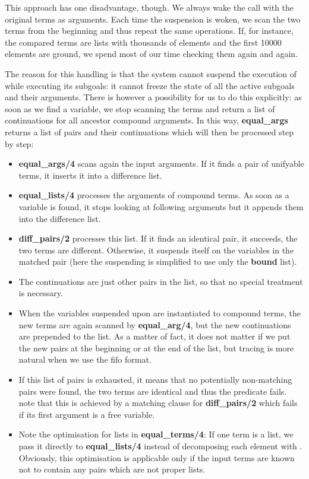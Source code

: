 This approach has one disadvantage, though.
We always wake the  call with the original terms
as arguments.
Each time the suspension is woken, we scan the two terms
from the beginning and thus repeat the same operations.
If, for instance, the compared terms are lists with thousands of elements
and the first 10000 elements are ground, we spend most of our time
checking them again and again.

The reason for this handling is that the system cannot suspend
the execution of  while executing its subgoals:
it cannot freeze the state of all the active subgoals and their
arguments.
There is however a possibility for us to do this explicitly:
as soon as we find a variable, we stop scanning the terms
and return a list of continuations for all ancestor compound arguments.
In this way, {\bf equal_args} returns a list of pairs
and their continuations which will then be processed step by step:
\begin{itemize}
\item {\bf equal_args/4} scans again the input arguments.
If it finds a pair of unifyable terms, it inserts it into
a difference list.

\item {\bf equal_lists/4} processes the arguments of compound terms.
As soon as a variable is found, it stops looking at following
arguments but it appends them into the difference list.

\item {\bf diff_pairs/2} processes this list.
If it finds an identical pair, it succeeds, the two terms
are different.
Otherwise, it suspends itself on the variables in the matched
pair (here the suspending is simplified to use only the {\bf bound}
list).

\item The continuations are just other pairs in the list,
so that no special treatment is necessary.

\item When the variables suspended upon are instantiated
to compound terms, the new terms are again scanned by {\bf equal_arg/4},
but the new continuations are prepended to the list.
As a matter of fact, it does not matter if we put the new
pairs at the beginning or at the end of the list,
but tracing is more natural when we use the fifo format.

\item If this list of pairs is exhausted, it means that
no potentially non-matching pairs were found, the two
terms are identical and thus the predicate fails.
note that this is achieved by a matching clause
for {\bf diff_pairs/2} which fails if its first
argument is a free variable.

\item Note the optimisation for lists in {\bf equal_terms/4}:
If one term is a list, we pass it directly to {\bf equal_lists/4}
instead of decomposing each element with .
Obviously, this optimisation is applicable only if the input
terms are known not to contain any pairs which are not proper lists.
\end{itemize}
